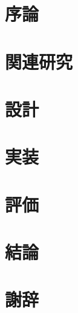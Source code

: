 \documentclass[12pt]{m-thesis}
\begin{document}





\pagestyle{headings}
\setcounter{page}{1}

\chapter{序論}
\label{chap:intro}


\chapter{関連研究}
\label{chap:related_work}


\chapter{設計}
\label{chap:design}


\chapter{実装}
\label{chap:implement}


\chapter{評価}
\label{chap:eval}


\chapter{結論}
\label{chap:conclusion}





\chapter*{謝辞}
\label{chap:acknowledgments}


% 
\end{document}
